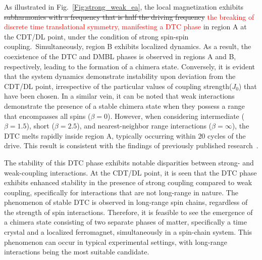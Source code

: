 \documentclass[12pt]{iopart}
\newcommand{\red}[1]{\textcolor{red}{#1}}
\begin{document}
As illustrated in Fig.~\ref{Fig:strong_weak_ea}, the local magnetization exhibits \sout{subharmonics with a frequency that is half the driving frequency} \red{the breaking of discrete time translational symmetry, manifesting a DTC phase} in region A at the CDT/DL point, under the condition of strong spin-spin coupling. Simultaneously, region B exhibits localized dynamics. As a result, the coexistence of the DTC and DMBL phases is observed in regions A and B, respectively, leading to the formation of a chimera state. Conversely, it is evident that the system dynamics demonstrate instability upon deviation from the CDT/DL point, irrespective of the particular values of coupling strength($J_0$) that have been chosen. In a similar vein, it can be noted that weak interactions demonstrate the presence of a stable chimera state when they possess a range that encompasses all spins ($\beta=0$). However, when considering intermediate ($\beta = 1.5$), short ($\beta = 2.5$), and nearest-neighbor range interactions ($\beta = \infty$), the DTC melts rapidly inside region A, typically occurring within $20$ cycles of the drive. This result is consistent with the findings of previously published research~\cite{sakurai_phys_nodate}.
	
The stability of this DTC phase exhibits notable disparities between strong- and weak-coupling interactions. At the CDT/DL point, it is seen that the DTC phase exhibits enhanced stability in the presence of strong coupling compared to weak coupling, specifically for interactions that are not long-range in nature. The phenomenon of stable DTC is observed in long-range spin chains, regardless of the strength of spin interactions. Therefore, it is feasible to see the emergence of a chimera state consisting of two separate phases of matter, specifically a time crystal and a localized ferromagnet, simultaneously in a spin-chain system. This phenomenon can occur in typical experimental settings, with long-range interactions being the most suitable candidate.
	
\end{document}

